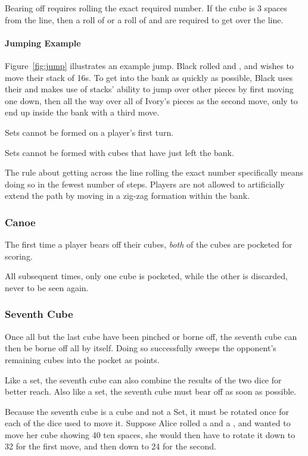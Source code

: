 Bearing off requires rolling the exact required number. If the cube is 3 spaces from the line, then a roll of  or a roll of  and  are required to get over the line.

\paragraph{Jumping Example}
Figure~\ref{fig:jump} illustrates an example jump.
Black rolled  and , and wishes to move their stack of 16s.
To get into the bank as quickly as possible, Black uses their  and makes use of stacks' ability to jump over other pieces by first moving one down, then all the way over all of Ivory's pieces as the second move, only to end up inside the bank with a third move.

\note Sets cannot be formed on a player's first turn.

\note Sets cannot be formed with cubes that have just left the bank.

\note The rule about getting across the line rolling the exact number specifically means doing so in the fewest number of steps. Players are not allowed to artificially extend the path by moving in a zig-zag formation within the bank.

\subsubsection{Canoe}
The first time a player bears off their cubes, \textit{both} of the cubes are pocketed for scoring.

All subsequent times, only one cube is pocketed, while the other is discarded, never to be seen again.

\subsubsection{Seventh Cube}
Once all but the last cube have been pinched or borne off, the seventh cube can then be borne off all by itself.
Doing so successfully sweeps the opponent's remaining cubes into the pocket as points.

Like a set, the seventh cube can also combine the results of the two dice for better reach.
Also like a set, the seventh cube must bear off as soon as possible.

\note Because the seventh cube is a cube and not a Set, it must be rotated once for each of the dice used to move it. Suppose Alice rolled a  and a , and wanted to move her cube showing 40 ten spaces, she would then have to rotate it down to 32 for the first move, and then down to 24 for the second.